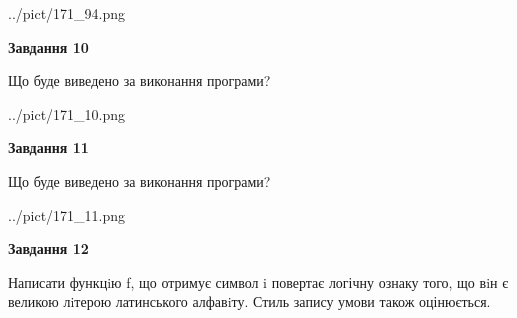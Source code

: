 \documentclass[12pt, ukrainian]{article}
\begin{document}
{\begin {large}
\begin{center}
	{../pict/171_94.png}
\end{center}
\newpage

{\begin {center}\textbf{Завдання 10}\end {center}}

Що буде виведено за виконання програми?\par
\begin{center}
	{../pict/171_10.png}
\end{center}
\newpage

{\begin {center}\textbf{Завдання 11}\end {center}}

Що буде виведено за виконання програми?\par
\begin{center}
	{../pict/171_11.png}
\end{center}
\newpage

{\begin {center}\textbf{Завдання 12}\end {center}}


Написати функцiю f, що отримує символ i повертає логічну ознаку того, що вiн є великою лiтерою латинського алфавiту. Стиль запису умови також оцінюється.\par
\newpage

\end {large}}
\end{document}

